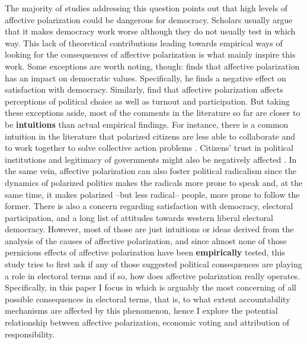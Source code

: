 \documentclass[a4paper, svgnames]{article}
\begin{document}
The majority of studies addressing this question points out that high levels of affective polarization could be dangerous for democracy. Scholars usually argue that it makes democracy work worse although they do not usually test in which way. This lack of theoretical contributions leading towards empirical ways of looking for the consequences of affective polarization is what mainly inspire this work. Some exceptions are worth noting, though: \cite{Wagner2021} finds that affective polarization has an impact on democratic values. Specifically, he finds a negative effect on satisfaction with democracy. Similarly, \cite{Ward2019} find that affective polarization affects perceptions of political choice as well as turnout and participation. But taking these exceptions aside, most of the comments in the literature so far are closer to be \textbf{intuitions} than actual empirical findings. For instance, there is a common intuition in the literature that polarized citizens are less able to collaborate and to work together to solve collective action problems \citep{Garrett2014}. Citizens' trust in political institutions and legitimacy of governments might also be negatively affected \citep{Orriols2021}. In the same vein, affective polarization can also foster political radicalism \citep{Levendusky2013, Rogowski2016a, Webster2017} since the dynamics of polarized politics makes the radicals more prone to speak and, at the same time, it makes polarized --but less radical-- people, more prone to follow the former. There is also a concern regarding satisfaction with democracy, electoral participation, and a long list of attitudes towards western liberal electoral democracy. However, most of those are just intuitions or ideas derived from the analysis of the causes of affective polarization, and since almost none of those pernicious effects of affective polarization have been \textbf{empirically} tested, this study tries to first ask if any of those suggested political consequences are playing a role in electoral terms and if so, how does affective polarization really operates. Specifically, in this paper I focus in which is arguably the most concerning of all possible consequences in electoral terms, that is, to what extent accountability mechanisms are affected by this phenomenon, hence I explore the potential relationship between affective polarization, economic voting and attribution of responsibility.
\end{document}
